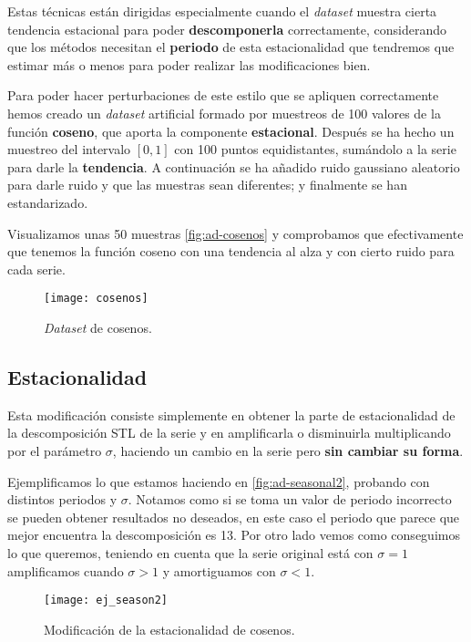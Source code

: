Estas técnicas están dirigidas especialmente cuando el \emph{dataset} muestra cierta tendencia estacional para poder \textbf{descomponerla} correctamente, considerando que los métodos necesitan el \textbf{periodo} de esta estacionalidad que tendremos que estimar más o menos para poder realizar las modificaciones bien.

Para poder hacer perturbaciones de este estilo que se apliquen correctamente hemos creado un \emph{dataset} artificial formado por muestreos de 100 valores de la función \textbf{coseno}, que aporta la componente \textbf{estacional}. Después se ha hecho un muestreo del intervalo $[0, 1]$ con 100 puntos equidistantes, sumándolo a la serie para darle la \textbf{tendencia}. A continuación se ha añadido ruido gaussiano aleatorio para darle ruido y que las muestras sean diferentes; y finalmente se han estandarizado.

Visualizamos unas 50 muestras \autoref{fig:ad-cosenos} y comprobamos que efectivamente que tenemos la función coseno con una tendencia al alza y con cierto ruido para cada serie.

\begin{figure}[htpb]
  \centering
  \texttt{[image: cosenos]}
  \caption{\emph{Dataset} de cosenos.}
  \label{fig:ad-cosenos}
\end{figure}

\subsection{Estacionalidad}

Esta modificación consiste simplemente en obtener la parte de estacionalidad de la descomposición STL de la serie y en amplificarla o disminuirla multiplicando por el parámetro $\sigma$, haciendo un cambio en la serie pero \textbf{sin cambiar su forma}.

Ejemplificamos lo que estamos haciendo en \autoref{fig:ad-seasonal2}, probando con distintos periodos y $\sigma$. Notamos como si se toma un valor de periodo incorrecto se pueden obtener resultados no deseados, en este caso el periodo que parece que mejor encuentra la descomposición es 13. Por otro lado vemos como conseguimos lo que queremos, teniendo en cuenta que la serie original está con $\sigma = 1$ amplificamos cuando $\sigma > 1$ y amortiguamos con $\sigma < 1$.

\begin{figure}[htpb]
  \centering
  \texttt{[image: ej\_season2]}
  \caption{Modificación de la estacionalidad de cosenos.}
  \label{fig:ad-seasonal2}
\end{figure}

